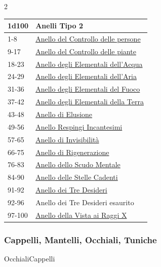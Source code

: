\begin{multicols}{2}
{{\small\begin{tabularx}{\linewidth}{ll}
		\toprule
\rowcolor{gray!20}\textbf{1d100} & \textbf{Anelli Tipo 2}\\
\toprule
1-8 & \hyperlink{Anello del Controllo delle persone}{Anello del Controllo delle persone}\\
\rowcolor{gray!20}9-17 & \hyperlink{Anello del Controllo delle piante}{Anello del Controllo delle piante}\\
18-23 & \hyperlink{Anello degli Elementali dell'Acqua}{Anello degli Elementali dell'Acqua}\\
\rowcolor{gray!20}24-29 & \hyperlink{Anello degli Elementali dell'Aria}{Anello degli Elementali dell'Aria}\\
31-36 & \hyperlink{Anello degli Elementali del Fuoco}{Anello degli Elementali del Fuoco}\\
\rowcolor{gray!20}37-42 & \hyperlink{Anello degli Elementali della Terra}{Anello degli Elementali della Terra}\\
43-48 & \hyperlink{Anello di Elusione}{Anello di Elusione}\\
\rowcolor{gray!20}49-56 & \hyperlink{Anello Respingi Incantesimi}{Anello Respingi Incantesimi}\\
57-65 & \hyperlink{Anello di Invisibilità}{Anello di Invisibilità}\\
\rowcolor{gray!20}66-75 & \hyperlink{Anello di Rigenerazione}{Anello di Rigenerazione}\\
76-83 & \hyperlink{Anello dello Scudo Mentale}{Anello dello Scudo Mentale}\\
\rowcolor{gray!20}84-90 & \hyperlink{Anello delle Stelle Cadenti}{Anello delle Stelle Cadenti}\\
91-92 & \hyperlink{Anello dei Tre Desideri}{Anello dei Tre Desideri}\\
\rowcolor{gray!20}92-96 & Anello dei Tre Desideri esaurito\\
97-100 & \hyperlink{Anello della Vista ai Raggi X}{Anello della Vista ai Raggi X}

\end{tabularx}}

\subsubsection{Cappelli, Mantelli, Occhiali, Tuniche}\label{cappellimantelli}\hypertarget{Mantelli}{}\hypertarget{Tuniche}{}\hypertarget{Occhiali}{Occhiali}\hypertarget{Cappelli}{Cappelli}

}
\end{multicols}
